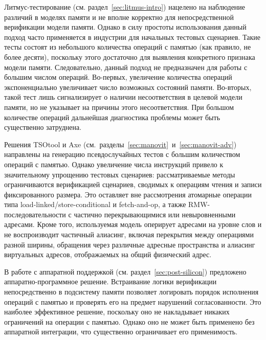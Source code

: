 Литмус-тестирование (см. раздел~\ref{sec:litmus-intro}) нацелено на
наблюдение различий в моделях памяти и не вполне корректно для
непосредственной верификации модели памяти. Однако в силу простоты
использования данный подход часто применяется в индустрии для
начальных тестовых сценариев. Такие тесты состоят из небольшого
количества операций с памятью (как правило, не более десяти),
поскольку этого достаточно для выявления конкретного признака модели
памяти. Следовательно, данный подход не предназначен для работы с
большим числом операций. Во-первых, увеличение количества операций
экспоненциально увеличивает число возможных состояний памяти.
Во-вторых, такой тест лишь сигнализирует о наличии несоответствия в
целевой модели памяти, но не указывает на причины этого
несоответствия. При большом количестве операций дальнейшая
диагностика проблемы может быть существенно затруднена.

Решения TSOtool и Axe
(см.~разделы~\ref{sec:manovit}~и~\ref{sec:manovit-adv}) направлены на
генерацию псевдослучайных тестов с большим количеством операций с
памятью. Однако увеличение числа инструкций привело к значительному
упрощению тестовых сценариев: рассматриваемые методы ограничиваются
верификацией сценариев, сводимых к операциям чтения и записи
фиксированного размера. Это оставляет вне рассмотрения атомарные
операции типа load-linked/store-conditional и fetch-and-op, а также
RMW-последовательности с частично перекрывающимися или невыровненными
адресами. Кроме того, используемая модель оперирует адресами на
уровне слов и не воспроизводит частичный алиасинг, включая перекрытия
между операциями разной ширины, обращения через различные адресные
пространства и алиасинг виртуальных адресов, отображаемых на общий
физический адрес.

В работе с аппаратной поддержкой (см. раздел~\ref{sec:post-silicon})
предложено аппаратно-программное решение. Встраивание логики
верификации непосредственно в подсистему памяти позволяет логировать
порядок исполнения операций с памятью и проверять его на предмет
нарушений согласованности. Это наиболее эффективное решение,
поскольку оно не накладывает никаких ограничений на операции с
памятью. Однако оно не может быть применено без аппаратной
интеграции, что существенно ограничивает его применимость.

